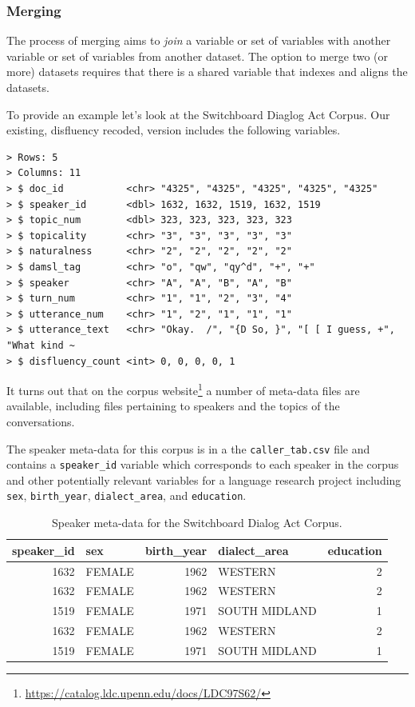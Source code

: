 \documentclass[
  letterpaper,
]{latex/krantz}
\DeclareRobustCommand{\href}[2]{#2\footnote{\url{#1}}}
\begin{document}
\hypertarget{merging}{%
\subsubsection{Merging}\label{merging}}

The process of merging aims to \emph{join} a variable or set of
variables with another variable or set of variables from another
dataset. The option to merge two (or more) datasets requires that there
is a shared variable that indexes and aligns the datasets.

To provide an example let's look at the Switchboard Diaglog Act Corpus.
Our existing, disfluency recoded, version includes the following
variables.

\begin{verbatim}
> Rows: 5
> Columns: 11
> $ doc_id           <chr> "4325", "4325", "4325", "4325", "4325"
> $ speaker_id       <dbl> 1632, 1632, 1519, 1632, 1519
> $ topic_num        <dbl> 323, 323, 323, 323, 323
> $ topicality       <chr> "3", "3", "3", "3", "3"
> $ naturalness      <chr> "2", "2", "2", "2", "2"
> $ damsl_tag        <chr> "o", "qw", "qy^d", "+", "+"
> $ speaker          <chr> "A", "A", "B", "A", "B"
> $ turn_num         <chr> "1", "1", "2", "3", "4"
> $ utterance_num    <chr> "1", "2", "1", "1", "1"
> $ utterance_text   <chr> "Okay.  /", "{D So, }", "[ [ I guess, +", "What kind ~
> $ disfluency_count <int> 0, 0, 0, 0, 1
\end{verbatim}

It turns out that on the
\href{https://catalog.ldc.upenn.edu/docs/LDC97S62/}{corpus website} a
number of meta-data files are available, including files pertaining to
speakers and the topics of the conversations.

The speaker meta-data for this corpus is in a the
\texttt{caller\_tab.csv} file and contains a \texttt{speaker\_id}
variable which corresponds to each speaker in the corpus and other
potentially relevant variables for a language research project including
\texttt{sex}, \texttt{birth\_year}, \texttt{dialect\_area}, and
\texttt{education}.

\hypertarget{tbl-merging-swda-speaker}{}
\begin{table}
\caption{\label{tbl-merging-swda-speaker}Speaker meta-data for the Switchboard Dialog Act Corpus. }\tabularnewline

\centering
\begin{tabular}{rlrlr}
\toprule
speaker\_id & sex & birth\_year & dialect\_area & education\\
\midrule
1632 & FEMALE & 1962 & WESTERN & 2\\
1632 & FEMALE & 1962 & WESTERN & 2\\
1519 & FEMALE & 1971 & SOUTH MIDLAND & 1\\
1632 & FEMALE & 1962 & WESTERN & 2\\
1519 & FEMALE & 1971 & SOUTH MIDLAND & 1\\
\bottomrule
\end{tabular}
\end{table}
\end{document}
